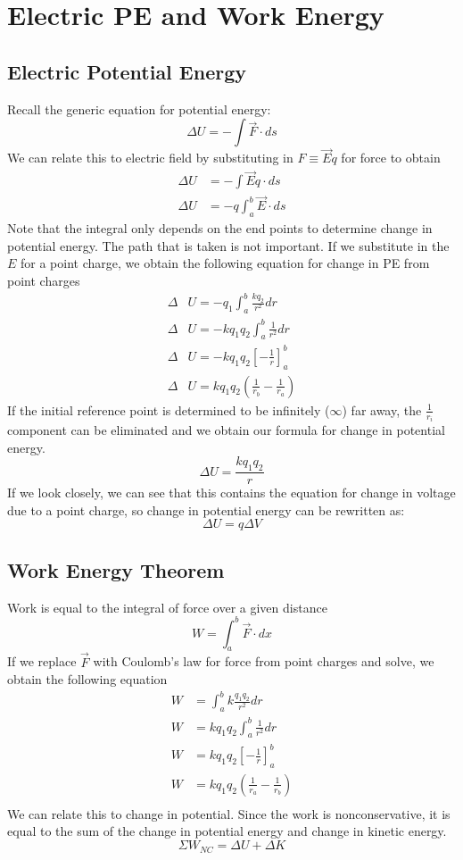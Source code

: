 \documentclass{article}
\begin{document}
\section{Electric PE and Work Energy}
\subsection{Electric Potential Energy}
Recall the generic equation for potential energy:
\[ \Delta U = - \int \vec{F} \cdot ds \]
We can relate this to electric field by substituting in $F \equiv \vec{E}q$ for force to obtain
\begin{align}
  \Delta U &= - \int \vec{E}q \cdot ds \\
  \Delta U &= -q \int_a^b \vec{E} \cdot ds
\end{align}
Note that the integral only depends on the end points to determine change in potential energy.  The path that is taken is not important.
If we substitute in the $E$ for a point charge, we obtain the following equation for change in PE from point charges
\begin{align}
  \Delta &U = -q_1 \int_a^b \frac{kq_2}{r^2}dr \\
  \Delta &U = -kq_1q_2 \int_a^b \frac{1}{r^2} dr \\
  \Delta &U = -kq_1q_2 \left[ - \frac{1}{r} \right]_a^b \\
  \Delta &U = kq_1q_2\left(\frac{1}{r_b} - \frac{1}{r_a}\right)
\end{align}
If the initial reference point is determined to be infinitely ($\infty$) far away, the $\frac{1}{r_i}$ component can be eliminated and we obtain our formula for change in potential energy.
\[ \Delta U = \frac{kq_1q_2}{r} \]
If we look closely, we can see that this contains the equation for change in voltage due to a point charge, so change in potential energy can be rewritten as:
\[ \Delta U = q \Delta V \]
\subsection{Work Energy Theorem}
Work is equal to the integral of force over a given distance
\[ W = \int_a^b \vec{F} \cdot dx \]
If we replace $\vec{F}$ with Coulomb's law for force from point charges and solve, we obtain the following equation
\begin{align}
  W &= \int_a^b k\frac{q_1q_2}{r^2} dr \\
  W &= kq_1q_2 \int_a^b \frac{1}{r^2} dr \\
  W &= kq_1q_2 \left[ -\frac{1}{r} \right]^b_a \\
  W &= kq_1q_2 \left( \frac{1}{r_a} - \frac{1}{r_b} \right) \\
\end{align}
We can relate this to change in potential.  Since the work is nonconservative, it is equal to the sum of the change in potential energy and change in kinetic energy.
\[ \Sigma W_{NC} = \Delta U + \Delta K \]
\end{document}
